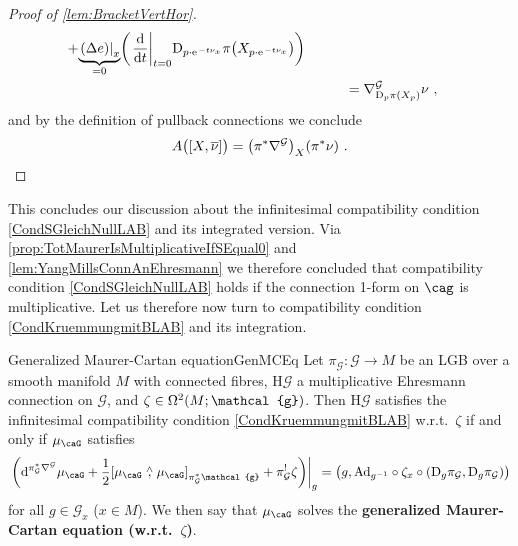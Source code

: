 \documentclass[reqno,a4paper,oneside]{amsart}
\newcommand\mutot{\mu_\caG}
\newcommand{\e}{\ensuremath{\mathrm{e\;\!}}}
\theoremstyle{plain}
\theoremstyle{remark}
\theoremstyle{definition}
\DeclareMathOperator{\sAd}{\mathKel{A\mkern-5.5mu d}}
\begin{document}
\begin{proof}[Proof of \ref{lem:BracketVertHor}]
\begin{align*}
	+ {\underbrace{\mleft. \mleft( \Delta e \mright) \mright|_{x}}_{= 0}}\mleft(\mleft.\frac{\mathrm{d}}{\mathrm{d}t}\mright|_{t=0}\mathrm{D}_{p \cdot \e^{-t\nu_x}}\pi \mleft(X_{p \cdot \e^{-t\nu_x}}\mright)\mright)
\\
&\hspace{1cm}=
\nabla^{\mathcal{G}}_{\mathrm{D}_{p}\pi \mleft(X_{p}\mright)} \nu~,
\end{align*}
and by the definition of pullback connections we conclude
\begin{equation*}
A\bigl( \mleft[ X, \overline{\nu} \mright] \bigr)
=
\mleft( \pi^*\nabla^{\mathcal{G}} \mright)_{X}(\pi^*\nu)~.
\end{equation*}
\end{proof}

This concludes our discussion about the infinitesimal compatibility condition \eqref{CondSGleichNullLAB} and its integrated version. Via \ref{prop:TotMaurerIsMultiplicativeIfSEqual0} and \ref{lem:YangMillsConnAnEhresmann} we therefore concluded that compatibility condition \eqref{CondSGleichNullLAB} holds if the connection 1-form on $\cag$ is multiplicative. Let us therefore now turn to compatibility condition \eqref{CondKruemmungmitBLAB} and its integration.

\begin{theorems}{Generalized Maurer-Cartan equation}{GenMCEq}
Let $\pi_{\mathcal{G}} \colon \mathcal{G} \to M$ be an LGB over a smooth manifold $M$ with connected fibres, $\mathrm{H}\mathcal{G}$ a multiplicative Ehresmann connection on $\mathcal{G}$, and $\zeta \in \Omega^2\mleft( M; \mathcal{g} \mright)$. Then $\mathrm{H}\mathcal{G}$ satisfies the infinitesimal compatibility condition \eqref{CondKruemmungmitBLAB} w.r.t.\ $\zeta$ if and only if $\mutot$ satisfies
\begin{equation}\label{THEGeneralizedMCEq}
\mleft.\mleft(\mathrm{d}^{\pi_{\mathcal{G}}^*\nabla^{\mathcal{G}}} \mutot
	+ \frac{1}{2} \mleft[ \mutot \stackrel{\wedge}{,} \mutot \mright]_{\pi_{\mathcal{G}}^*\mathcal{g}}
	+ \pi_{\mathcal{G}}^! \zeta\mright)\mright|_g
=
\mleft( g, \mathrm{Ad}_{g^{-1}} \circ \zeta_x \circ \mleft(\mathrm{D}_g \pi_{\mathcal{G}}, \mathrm{D}_g \pi_{\mathcal{G}}\mright) \mright)
\end{equation}
for all $g \in \mathcal{G}_x$ ($x \in M$). We then say that $\mutot$ solves the \textbf{generalized Maurer-Cartan equation (w.r.t.\ $\zeta$)}.
\end{theorems}
\end{document}
